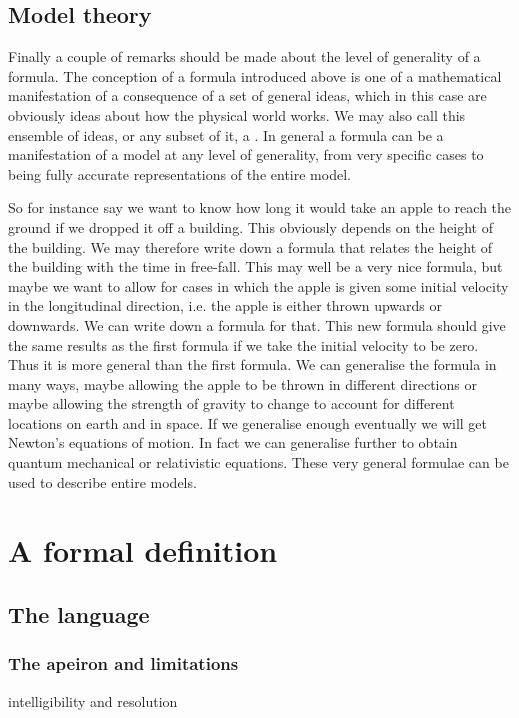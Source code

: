 \subsection{Model theory}
Finally a couple of remarks should be made about the level of generality of a formula. The conception of a formula introduced above is one of a mathematical manifestation of a consequence of a set of general ideas, which in this case are obviously ideas about how the physical world works. We may also call this ensemble of ideas, or any subset of it, a . In general a formula can be a manifestation of a model at any level of generality, from very specific cases to being fully accurate representations of the entire model.

\begin{example}
So for instance say we want to know how long it would take an apple to reach the ground if we dropped it off a building. This obviously depends on the height of the building. We may therefore write down a formula that relates the height of the building with the time in free-fall. This may well be a very nice formula, but maybe we want to allow for cases in which the apple is given some initial velocity in the longitudinal direction, i.e. the apple is either thrown upwards or downwards. We can write down a formula for that. This new formula should give the same results as the first formula if we take the initial velocity to be zero. Thus it is more general than the first formula. We can generalise the formula in many ways, maybe allowing the apple to be thrown in different directions or maybe allowing the strength of gravity to change to account for different locations on earth and in space. If we generalise enough eventually we will get Newton's equations of motion. In fact we can generalise further to obtain quantum mechanical or relativistic equations. These very general formulae can be used to describe entire models.
\end{example}


\section{A formal definition}

\subsection{The language}
\subsubsection{The apeiron and limitations}
intelligibility and resolution

